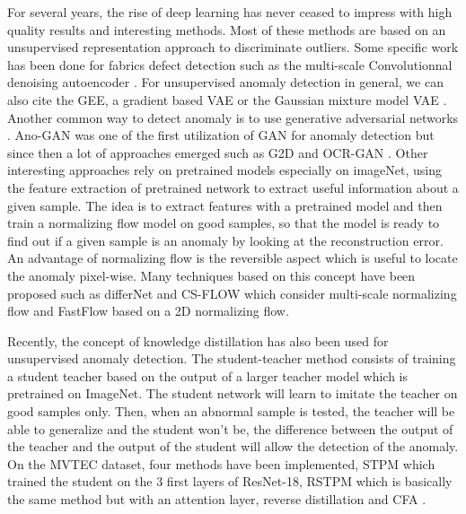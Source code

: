 \documentclass[a4paper,twoside]{article}
\begin{document}
For several years, the rise of deep learning has never ceased to impress with high quality results and interesting methods. Most of these methods are based on an unsupervised representation approach to discriminate outliers. Some specific work has been done for fabrics defect detection such as the multi-scale Convolutionnal denoising autoencoder \citep{mei_automatic_2018}. For unsupervised anomaly detection in general, we can also cite the GEE, a gradient based VAE \citep{nguyen_gee_2019} or the Gaussian mixture model VAE \citep{nguyen_gee_2019}. Another common way to detect anomaly is to use generative adversarial networks \citep{goodfellow_generative_2014}. Ano-GAN \citep{schlegl_f-anogan_2019} was one of the first utilization of GAN for anomaly detection but since then a lot of approaches emerged such as G2D \citep{pourreza_g2d_2021} and OCR-GAN \citep{liang_omni-frequency_2022}. Other interesting approaches rely on pretrained models especially on imageNet, using the feature extraction of pretrained network to extract useful information about a given sample. The idea is to extract features with a pretrained model and then train a normalizing flow model on good samples, so that the model is ready to find out if a given sample is an anomaly by looking at the reconstruction error. An advantage of normalizing flow is the reversible aspect which is useful to locate the anomaly pixel-wise. Many techniques based on this concept have been proposed such as differNet \citep{rudolph_same_2021} and CS-FLOW \citep{rudolph_fully_2021} which consider multi-scale normalizing flow and FastFlow \citep{yu_fastflow_2021} based on a 2D normalizing flow. 

Recently, the concept of knowledge distillation has also been used for unsupervised anomaly detection. The student-teacher method consists of training a student teacher based on the output of a larger teacher model which is pretrained on ImageNet. The student network will learn to imitate the teacher on good samples only. Then, when an abnormal sample is tested, the teacher will be able to generalize and the student won't be, the difference between the output of the teacher and the output of the student will allow the detection of the anomaly. On the MVTEC dataset, four methods have been implemented, STPM \citep{wang_student-teacher_2021} which trained the student on the 3 first layers of ResNet-18, RSTPM \citep{yamada_reconstruction_nodate} which is basically the same method but with an attention layer, reverse distillation \citep{deng_anomaly_2022} and CFA \citep{lee_cfa_2022}.
\end{document}
